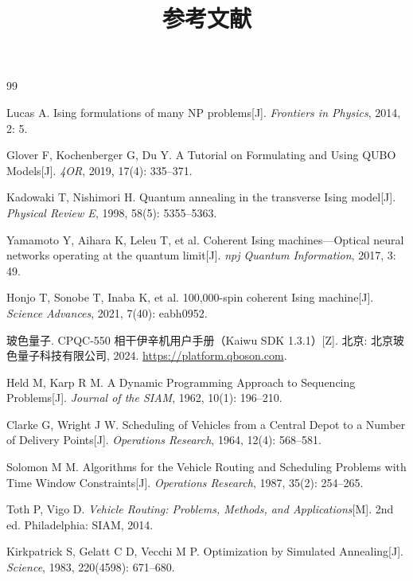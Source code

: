 \documentclass[UTF8,12pt,a4paper]{ctexart}
\title{参考文献}
\author{}
\date{}
\begin{document}
\maketitle

\begin{thebibliography}{99}

Lucas A. Ising formulations of many NP problems[J]. \emph{Frontiers in Physics}, 2014, 2: 5.

Glover F, Kochenberger G, Du Y. A Tutorial on Formulating and Using QUBO Models[J]. \emph{4OR}, 2019, 17(4): 335--371.

Kadowaki T, Nishimori H. Quantum annealing in the transverse Ising model[J]. \emph{Physical Review E}, 1998, 58(5): 5355--5363.

Yamamoto Y, Aihara K, Leleu T, et al. Coherent Ising machines---Optical neural networks operating at the quantum limit[J]. \emph{npj Quantum Information}, 2017, 3: 49.

Honjo T, Sonobe T, Inaba K, et al. 100,000-spin coherent Ising machine[J]. \emph{Science Advances}, 2021, 7(40): eabh0952.

玻色量子. CPQC-550 相干伊辛机用户手册（Kaiwu SDK 1.3.1）[Z]. 北京: 北京玻色量子科技有限公司, 2024. \url{https://platform.qboson.com}.

Held M, Karp R M. A Dynamic Programming Approach to Sequencing Problems[J]. \emph{Journal of the SIAM}, 1962, 10(1): 196--210.

Clarke G, Wright J W. Scheduling of Vehicles from a Central Depot to a Number of Delivery Points[J]. \emph{Operations Research}, 1964, 12(4): 568--581.

Solomon M M. Algorithms for the Vehicle Routing and Scheduling Problems with Time Window Constraints[J]. \emph{Operations Research}, 1987, 35(2): 254--265.

Toth P, Vigo D. \emph{Vehicle Routing: Problems, Methods, and Applications}[M]. 2nd ed. Philadelphia: SIAM, 2014.

Kirkpatrick S, Gelatt C D, Vecchi M P. Optimization by Simulated Annealing[J]. \emph{Science}, 1983, 220(4598): 671--680.


\end{thebibliography}
\end{document}
